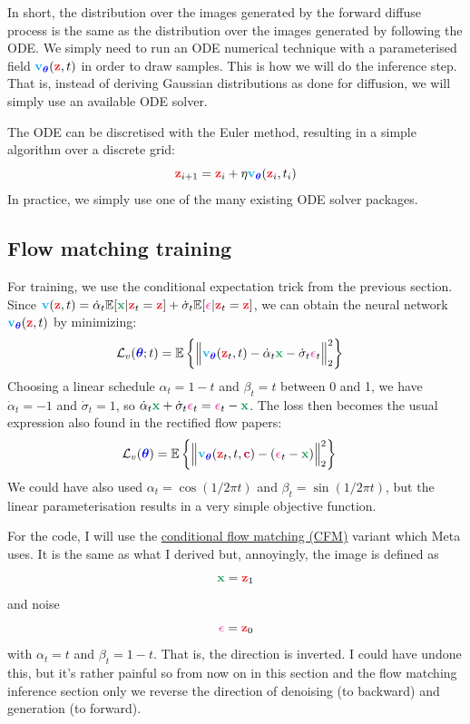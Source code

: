 \documentclass[usenames,dvipsnames]{article}
\DeclarePairedDelimiter{\norm}{\lVert}{\rVert}
\newcommand{\myvec}[1]{\mathbf{#1}}
\newcommand{\myvecsym}[1]{\boldsymbol{#1}}
\newcommand{\vx}{\myvec{\textcolor{ForestGreen}{x}}}
\newcommand{\vz}{\myvec{\textcolor{Red}{z}}}
\newcommand{\vc}{\myvec{\textcolor{purple}{c}}}
\newcommand{\vv}{\myvec{\textcolor{Cyan}{v}}}
\newcommand{\vtheta}{\myvecsym{\textcolor{blue}{\theta}}}
\newcommand{\vepsilon}{\myvecsym{\textcolor{CarnationPink}{\epsilon}}}
\newcommand{\loss}{{\cal L}}
\newcommand{\E}{\mathbb{E}} %
\newcommand{\be}{\begin{equation}}
\newcommand{\ee}{\end{equation}}
\begin{document}
In short, the distribution over the images generated by the forward diffuse process is the same as the distribution over the images generated by following the ODE.
We simply need to run an ODE numerical technique with a parameterised field $ \vv_{\vtheta}(\vz, t) $ in order to draw samples. This is how we will do the inference step. That is, instead of deriving Gaussian distributions as done for diffusion, we will simply use an available ODE solver.

The ODE can be discretised with the Euler method, resulting in a simple algorithm over a discrete grid:
\be
\vz_{i+1} = \vz_{i} + \eta \vv_{\vtheta}(\vz_i, t_i)
\ee
In practice, we simply use one of the many existing ODE solver packages.

\subsection{Flow matching training}

For training, we use the conditional expectation trick from the previous section. Since $\vv(\vz, t) = \dot{\alpha}_t \mathbb{E}[\vx | \vz_t = \vz] + \dot{\sigma}_t \mathbb{E}[\vepsilon | \vz_t = \vz]$, we can obtain the neural network $ \vv_{\vtheta}(\vz, t) $ by minimizing:
\begin{align}
  \loss_{v}(\vtheta;t)
&=
 \E
 \left\{  
 \norm[\Big]{\vv_{\vtheta}(\vz_t,t)
   - \dot{\alpha}_t \vx - \dot{\sigma}_t \vepsilon_t
   }_2^2
   \right\}
\nonumber
\end{align}
Choosing a linear schedule $\alpha_t = 1-t$ and $\beta_t = t$ between 0 and 1, we have $\dot{\alpha}_t = -1$ and $\dot{\sigma}_t = 1$, so $\dot{\alpha}_t \vx + \dot{\sigma}_t \vepsilon_t = \vepsilon_t - \vx$. The loss then becomes the usual expression also found in the rectified flow papers:
\begin{align}
  \loss_{v}(\vtheta)
&=
 \E
 \left\{  
 \norm[\Big]{\vv_{\vtheta}(\vz_t,t,\vc)
   -  (\vepsilon_t - \vx)
   }_2^2
   \right\}
\nonumber
\end{align}
We could have also used $\alpha_t = \cos(1/2\pi t)$ and $\beta_t = \sin (1/2 \pi t)$, but the linear parameterisation results in a very simple objective function.

For the code, I will use the \href{https://arxiv.org/abs/2210.02747}{conditional flow matching (CFM)} variant which Meta uses. It is the same as what I derived but, annoyingly, the image is defined as \[\vx = \vz_1\] and noise \[\vepsilon = \vz_0\] with $\alpha_t = t$ and $\beta_t = 1-t$. That is, the direction is inverted. I could have undone this, but it's rather painful so from now on in this section and the flow matching inference section only we reverse the direction of denoising (to backward) and generation (to forward).    
\end{document}

